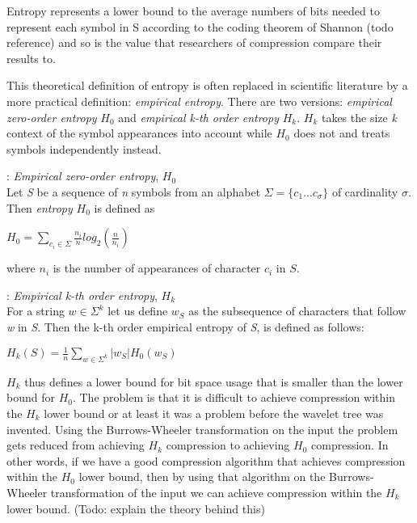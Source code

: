 Entropy represents a lower bound to the average numbers of bits needed to represent each symbol in S according to the coding theorem of Shannon (todo reference) and so is the value that researchers of compression compare their results to.

This theoretical definition of entropy is often replaced in scientific literature by a more practical definition: \textit{empirical entropy}.
There are two versions: \textit{empirical zero-order entropy} $H_0$ and \textit{empirical k-th order entropy} $H_k$. $H_k$ takes the size \textit{k} context of the symbol appearances into account while $H_0$ does not and treats symbols independently instead. 

\begin{mdframed}[nobreak, linecolor=lightgray]
\begin{definition}: \textit{Empirical zero-order entropy}, $H_0$ \\
Let \textit{S} be a sequence of \textit{n} symbols from an alphabet $\Sigma = \lbrace c_1 ... c_\sigma \rbrace$ of cardinality $\sigma$.
Then \textit{entropy} $H_0$ is defined as
\begin{center}
$H_0 = \sum\limits_{c_i \in \Sigma} \frac{n_i}{n} log_2(\frac{n}{n_i})$
\end{center}
where $n_i$ is the number of appearances of character $c_i$ in $S$.
\end{definition}
\begin{definition}: \textit{Empirical k-th order entropy}, $H_k$ \\
For a string $w \in \Sigma^k$ let us define $w_S$ as the subsequence of characters that follow \textit{w} in \textit{S}. 
Then the k-th order empirical entropy of \textit{S}, is defined as follows:
\begin{center}
$H_k(S) = \frac{1}{n} \sum\limits_{w \in \Sigma^k} | w_S |H_0(w_S)$
\end{center}
\end{definition}
\end{mdframed}
$H_k$ thus defines a lower bound for bit space usage that is smaller than the lower bound for $H_0$.
The problem is that it is difficult to achieve compression within the $H_k$ lower bound or at least it was a problem before the wavelet tree was invented. 
Using the Burrows-Wheeler transformation on the input the problem gets reduced from achieving $H_k$ compression to achieving $H_0$ compression.
In other words, if we have a good compression algorithm that achieves compression within the $H_0$ lower bound, then by using that algorithm on the Burrows-Wheeler transformation of the input we can achieve compression within the $H_k$ lower bound. (Todo: explain the theory behind this)

